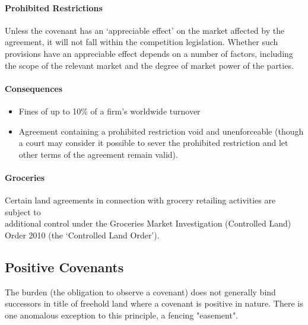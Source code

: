 \documentclass[
]{article}
\providecommand{\tightlist}{%
  \setlength{\itemsep}{0pt}\setlength{\parskip}{0pt}}
\begin{document}
\hypertarget{prohibited-restrictions}{%
\paragraph{Prohibited Restrictions}\label{prohibited-restrictions}}

Unless the covenant has an `appreciable effect' on the market affected
by the\\
agreement, it will not fall within the competition legislation. Whether
such provisions have an appreciable effect depends on a number of
factors, including the scope of the relevant market and the degree of
market power of the parties.

\hypertarget{consequences}{%
\paragraph{Consequences}\label{consequences}}

\begin{itemize}
\tightlist
\item
  Fines of up to 10\% of a firm's worldwide turnover
\item
  Agreement containing a prohibited restriction void and unenforceable
  (though a court may consider it possible to sever the prohibited
  restriction and let other terms of the agreement remain valid).
\end{itemize}

\hypertarget{groceries}{%
\paragraph{Groceries}\label{groceries}}

Certain land agreements in connection with grocery retailing activities
are subject to\\
additional control under the Groceries Market Investigation (Controlled
Land) Order 2010 (the `Controlled Land Order').

\hypertarget{positive-covenants}{%
\subsection{Positive Covenants}\label{positive-covenants}}

The burden (the obligation to observe a covenant) does not generally
bind successors in title of freehold land where a covenant is positive
in nature. There is one anomalous exception to this principle, a fencing
"easement".
\end{document}
